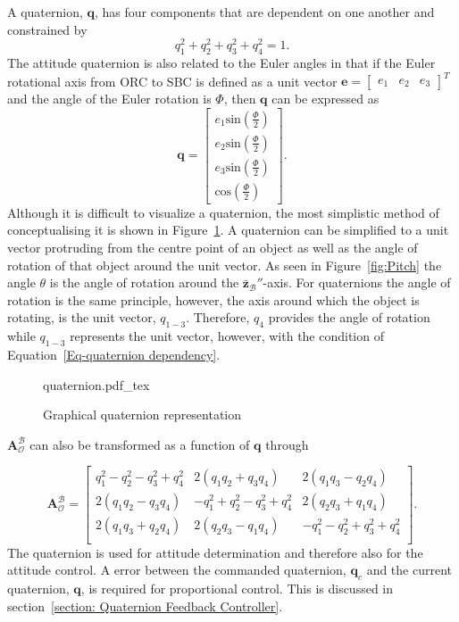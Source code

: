 A quaternion, $\mathbf{q}$, has four components that are dependent on one another and constrained by 
\begin{equation} 
\label{Eq-quaternion dependency}
q_1^2 + q_2^2 + q_3^2 + q_4^2 = 1.
\end{equation}
The attitude quaternion is also related to the Euler angles in that if the Euler rotational axis from ORC to SBC is defined as a unit vector $\mathbf{e} = \begin{bmatrix} e_1  & e_2 & e_3 \end{bmatrix}^T$ and the angle of the Euler rotation is $\Phi$, then $\mathbf{q}$ can be expressed as
\begin{equation}
\mathbf{q} = \begin{bmatrix} e_1 \text{sin}(\frac{\Phi}{2}) \\ e_2 \text{sin}(\frac{\Phi}{2}) \\ e_3 \text{sin}(\frac{\Phi}{2}) \\ \text{cos}(\frac{\Phi}{2}) \end{bmatrix}.
\end{equation}
Although it is difficult to visualize a quaternion, the most simplistic method of conceptualising it is shown in Figure~\ref{fig:quaternion}. A quaternion can be simplified to a unit vector protruding from the centre point of an object as well as the angle of rotation of that object around the unit vector. As seen in Figure~\ref{fig:Pitch} the angle $\theta$ is the angle of rotation around the $\bar{\mathbf{z}}_\mathcal{B}''$-axis. For quaternions the angle of rotation is the same principle, however, the axis around which the object is rotating, is the unit vector, $q_{1-3}$. Therefore, $q_4$ provides the angle of rotation while $q_{1-3}$ represents the unit vector, however, with the condition of Equation~\ref{Eq-quaternion dependency}.

\begin{figure}[!htb]
	\centering
	\def\svgwidth{10cm}
	{quaternion.pdf_tex}
	\caption{Graphical quaternion representation}
	\label{fig:quaternion}
\end{figure}

$\boldsymbol{A}^{\mathcal{B}}_{\mathcal{O}}$ can also be transformed as a function of $\mathbf{q}$ \cite{wertz2012spacecraft} through

\begin{equation}
\label{eq:DCM_quaternion}
	\boldsymbol{A}^{\mathcal{B}}_{\mathcal{O}}
		= \begin{bmatrix}
		q_1^2 - q_2^2 - q_3^2 + q_4^2 & 2(q_1q_2 + q_3q_4) & 2(q_1q_3 - q_2q_4) \\
		2(q_1q_2 - q_3q_4) & -q_1^2 + q_2^2 - q_3^2 + q_4^2 & 2(q_2q_3 + q_1q_4) \\
		2(q_1q_3 + q_2q_4) & 2(q_2q_3 - q_1q_4) & -q_1^2 - q_2^2 + q_3^2 + q_4^2 \\
		\end{bmatrix}.
\end{equation}
The quaternion is used for attitude determination and therefore also for the attitude control. A error between the commanded quaternion, $\mathbf{q}_c$ and the current quaternion, $\mathbf{q}$, is required for proportional control. This is discussed in section~\ref{section: Quaternion Feedback Controller}.

